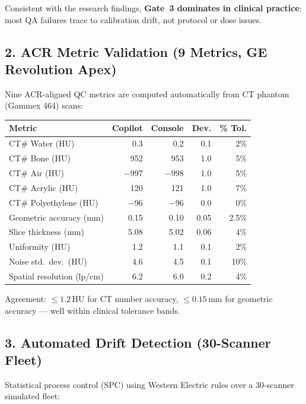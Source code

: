 \documentclass[11pt]{article}
\begin{document}
\noindent Consistent with the research findings, \textbf{Gate~3 dominates in clinical practice}: most QA failures trace to calibration drift, not protocol or dose issues.

\subsection*{2. ACR Metric Validation (9 Metrics, GE Revolution Apex)}

Nine ACR-aligned QC metrics are computed automatically from CT phantom (Gammex 464) scans:

\begin{center}
\begin{tabular}{lrrrr}
\toprule
\textbf{Metric} & \textbf{Copilot} & \textbf{Console} & \textbf{Dev.} & \textbf{\% Tol.} \\
\midrule
CT\# Water (HU)          & 0.3     & 0.2     & 0.1   & 2\% \\
CT\# Bone (HU)           & 952     & 953     & 1.0   & 5\% \\
CT\# Air (HU)            & $-$997  & $-$998  & 1.0   & 5\% \\
CT\# Acrylic (HU)        & 120     & 121     & 1.0   & 7\% \\
CT\# Polyethylene (HU)   & $-$96   & $-$96   & 0.0   & 0\% \\
Geometric accuracy (mm)  & 0.15    & 0.10    & 0.05  & 2.5\% \\
Slice thickness (mm)     & 5.08    & 5.02    & 0.06  & 4\% \\
Uniformity (HU)          & 1.2     & 1.1     & 0.1   & 2\% \\
Noise std.\ dev.\ (HU)  & 4.6     & 4.5     & 0.1   & 10\% \\
Spatial resolution (lp/cm) & 6.2   & 6.0     & 0.2   & 4\% \\
\bottomrule
\end{tabular}
\end{center}

\noindent Agreement: $\leq 1.2$\,HU for CT number accuracy, $\leq 0.15$\,mm for geometric accuracy --- well within clinical tolerance bands.

\subsection*{3. Automated Drift Detection (30-Scanner Fleet)}

Statistical process control (SPC) using Western Electric rules over a 30-scanner simulated fleet:
\end{document}
